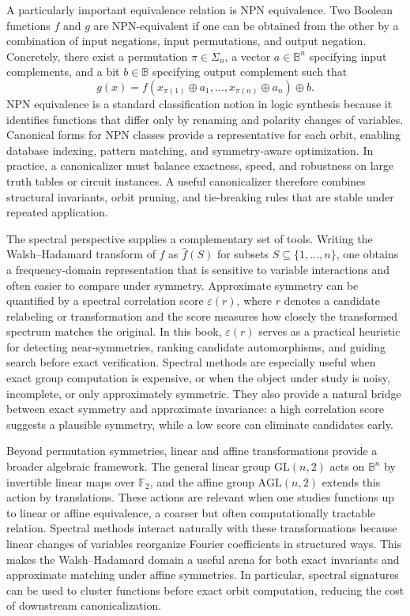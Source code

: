 \documentclass[11pt]{article}
\begin{document}
A particularly important equivalence relation is NPN equivalence. Two Boolean functions $f$ and $g$ are NPN-equivalent if one can be obtained from the other by a combination of input negations, input permutations, and output negation. Concretely, there exist a permutation $\pi \in \Sigma_n$, a vector $a \in \mathbb{B}^n$ specifying input complements, and a bit $b \in \mathbb{B}$ specifying output complement such that
\[
  g(x) = f(x_{\pi(1)} \oplus a_1,\dots,x_{\pi(n)} \oplus a_n) \oplus b.
\]
NPN equivalence is a standard classification notion in logic synthesis because it identifies functions that differ only by renaming and polarity changes of variables. Canonical forms for NPN classes provide a representative for each orbit, enabling database indexing, pattern matching, and symmetry-aware optimization. In practice, a canonicalizer must balance exactness, speed, and robustness on large truth tables or circuit instances. A useful canonicalizer therefore combines structural invariants, orbit pruning, and tie-breaking rules that are stable under repeated application.

The spectral perspective supplies a complementary set of tools. Writing the Walsh--Hadamard transform of $f$ as $\widehat{f}(S)$ for subsets $S \subseteq \{1,\dots,n\}$, one obtains a frequency-domain representation that is sensitive to variable interactions and often easier to compare under symmetry. Approximate symmetry can be quantified by a spectral correlation score $\varepsilon(r)$, where $r$ denotes a candidate relabeling or transformation and the score measures how closely the transformed spectrum matches the original. In this book, $\varepsilon(r)$ serves as a practical heuristic for detecting near-symmetries, ranking candidate automorphisms, and guiding search before exact verification. Spectral methods are especially useful when exact group computation is expensive, or when the object under study is noisy, incomplete, or only approximately symmetric. They also provide a natural bridge between exact symmetry and approximate invariance: a high correlation score suggests a plausible symmetry, while a low score can eliminate candidates early.

Beyond permutation symmetries, linear and affine transformations provide a broader algebraic framework. The general linear group $\mathrm{GL}(n,2)$ acts on $\mathbb{B}^n$ by invertible linear maps over $\mathbb{F}_2$, and the affine group $\mathrm{AGL}(n,2)$ extends this action by translations. These actions are relevant when one studies functions up to linear or affine equivalence, a coarser but often computationally tractable relation. Spectral methods interact naturally with these transformations because linear changes of variables reorganize Fourier coefficients in structured ways. This makes the Walsh--Hadamard domain a useful arena for both exact invariants and approximate matching under affine symmetries. In particular, spectral signatures can be used to cluster functions before exact orbit computation, reducing the cost of downstream canonicalization.
\end{document}

